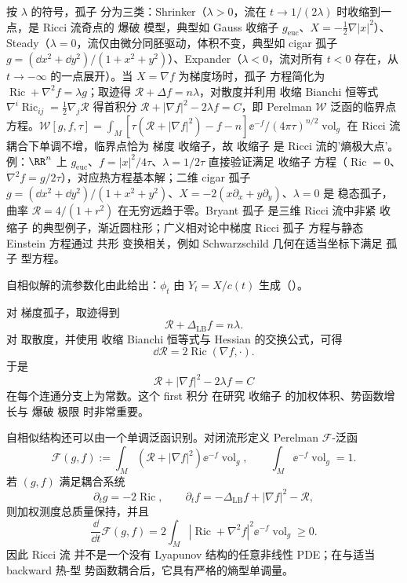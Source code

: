 按 $\lambda$ 的符号，孤子 分为三类：Shrinker（$\lambda>0$，流在 $t\to1/(2\lambda)$ 时收缩到一点，是 Ricci 流奇点的 爆破 模型，典型如 Gauss 收缩子 $g_{\mathrm{euc}}$、$X=-\tfrac12\nabla|x|^2$）、Steady（$\lambda=0$，流仅由微分同胚驱动，体积不变，典型如 cigar 孤子 $g=(\dd x^2+\dd y^2)/(1+x^2+y^2)$）、Expander（$\lambda<0$，流对所有 $t<0$ 存在，从 $t\to-\infty$ 的一点展开）。当 $X=\nabla f$ 为梯度场时，孤子 方程简化为 $\operatorname{Ric}+\nabla^2f=\lambda g$；取迹得 $\mathcal R+\Delta f=n\lambda$，对散度并利用 收缩 Bianchi 恒等式 $\nabla^i\operatorname{Ric}_{ij}=\tfrac12\nabla_j\mathcal R$ 得首积分 $\mathcal R+|\nabla f|^2-2\lambda f=C$，即 Perelman $\mathcal W$ 泛函的临界点方程。$\mathcal W[g,f,\tau]=\int_M[\tau(\mathcal R+|\nabla f|^2)-f-n]\ee^{-f}/(4\pi\tau)^{n/2}\operatorname{vol}_g$ 在 Ricci 流耦合下单调不增，临界点恰为 梯度 收缩子，故 收缩子 是 Ricci 流的'熵极大点'。例：$\RR^n$ 上 $g_{\mathrm{euc}}$、$f=|x|^2/4\tau$、$\lambda=1/2\tau$ 直接验证满足 收缩子 方程（$\operatorname{Ric}=0$、$\nabla^2f=g/2\tau$），对应热方程基本解；二维 cigar 孤子 $g=(\dd x^2+\dd y^2)/(1+x^2+y^2)$、$X=-2(x\partial_x+y\partial_y)$、$\lambda=0$ 是 稳态孤子，曲率 $\mathcal R=4/(1+r^2)$ 在无穷远趋于零。Bryant 孤子 是三维 Ricci 流中非紧 收缩子 的典型例子，渐近圆柱形；广义相对论中梯度 Ricci 孤子 方程与静态 Einstein 方程通过 共形 变换相关，例如 Schwarzschild 几何在适当坐标下满足 孤子 型方程。

自相似解的流参数化由此给出：$\phi_t$ 由 $Y_t=X/c(t)$ 生成（）。

对 梯度孤子，取迹得到
\begin{equation*}\mathcal R+\Delta_{\mathrm{LB}}f=n\lambda.\end{equation*}
对 取散度，并使用 收缩 Bianchi 恒等式与 Hessian 的交换公式，可得
\[
\dd\mathcal R=2\operatorname{Ric}(\nabla f,\cdot).
\]
于是
\begin{equation*}\boxed{
\mathcal R+|\nabla f|^2-2\lambda f=C
}\end{equation*}
在每个连通分支上为常数。这个 first 积分 在研究 收缩子 的加权体积、势函数增长与 爆破 极限 时非常重要。

自相似结构还可以由一个单调泛函识别。对闭流形定义 Perelman $\mathcal F$-泛函
\begin{equation*}\mathcal F(g,f)
:=\int_M
\left(\mathcal R+|\nabla f|^2\right)
\ee^{-f}\operatorname{vol}_g,
\qquad
\int_M\ee^{-f}\operatorname{vol}_g=1.\end{equation*}
若 $(g,f)$ 满足耦合系统
\begin{equation}
\partial_tg=-2\operatorname{Ric},
\qquad
\partial_tf
=-\Delta_{\mathrm{LB}}f+|\nabla f|^2-\mathcal R,
\label{eq:math-dg-perelman-coupled-flow}
\end{equation}
则加权测度总质量保持，并且
\begin{equation}
\boxed{
\frac{\dd}{\dd t}\mathcal F(g,f)
=2\int_M
|\operatorname{Ric}+\nabla^2f|^2
\ee^{-f}\operatorname{vol}_g
\ge0.
}
\label{eq:math-dg-perelman-f-monotonicity}
\end{equation}
因此 Ricci 流 并不是一个没有 Lyapunov 结构的任意非线性 PDE；在与适当 backward 热-型 势函数耦合后，它具有严格的熵型单调量。

